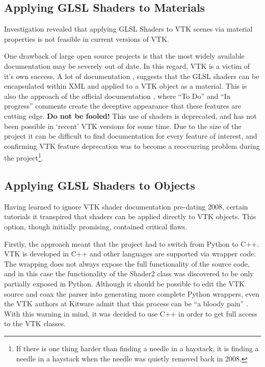 \documentclass[MSc,paper=a4,pagesize=auto]{icldt}
\begin{document}
\subsection{Applying GLSL Shaders to Materials}
Investigation revealed that applying GLSL Shaders to VTK scenes via material properties is not feasible in current versions of VTK.

One drawback of large open source projects is that the most widely available documentation may be severely out of date. In this regard, VTK is a victim of it's own success. A lot of documentation \cite{Seip2005}, \cite{OBrien2009} suggests that the GLSL shaders can be encapsulated within XML and applied to a VTK object as a material. This is also the approach of the official documentation \cite{VTK_XML_shaders}, where ``To Do'' and ``In progress'' comments create the deceptive appearance that these features are cutting edge. \textbf{Do not be fooled!} This use of shaders is deprecated, and has not been possible in `recent' VTK versions for some time. Due to the size of the project it can be difficult to find documentation for every feature of interest, and confirming VTK feature deprecation was to become a reoccurring problem during the project\footnote{If there is one thing harder than finding a needle in a haystack, it is finding a needle in a haystack when the needle was quietly removed back in 2008.}.

\subsection{Applying GLSL Shaders to Objects}
Having learned to ignore VTK shader documentation pre-dating 2008, certain tutorials it transpired that shaders can be applied directly to VTK objects. This option, though initially promising, contained critical flaws. 

Firstly, the approach meant that the project had to switch from Python to C++. VTK is developed in C++ and other languages are supported via wrapper code. The wrapping does not always expose the full functionality of the source code, and in this case the functionality of the Shader2 class was discovered to be only partially exposed in Python. Although it should be possible to edit the VTK source and coax the parser into generating more complete Python wrappers, even the VTK authors at Kitware admit that this process can be ``a bloody pain'' \cite{VTK_Wrapper_FAQ}. With this warning in mind, it was decided to use C++ in order to get full access to the VTK classes.
\end{document}
